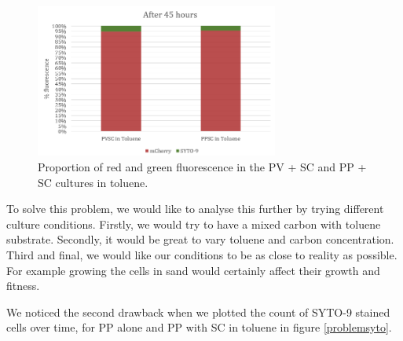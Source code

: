 \documentclass[a4paper, 10pt, conference]{ieeeconf}   %
\begin{document}
\begin{figure}
	\centering
	 
	\includegraphics[width=8cm]{problem_barplot.PNG}
	\caption{Proportion of red and green fluorescence in the PV + SC and PP + SC cultures in toluene.}
	\label{barplot}
	  
\end{figure}
To solve this problem, we would like to analyse this further by trying different culture conditions. Firstly, we would try to have a mixed carbon with toluene substrate. Secondly, it would be great to vary toluene and carbon concentration. Third and final, we would like our conditions to be as close to reality as possible. For example growing the cells in sand would certainly affect their growth and fitness.

We noticed the second drawback when we plotted the count of SYTO-9 stained cells over time, for PP alone and PP with SC in toluene in figure \ref {problemsyto}. 
\end{document}
